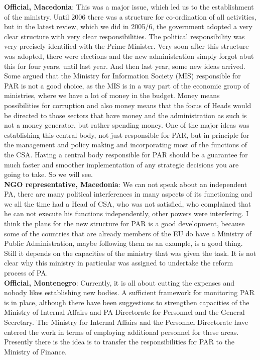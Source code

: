 \textbf{Official, Macedonia}: This was a major issue, which led us to the establishment of the ministry. Until 2006 there was a structure for co-ordination of all activities, but in the latest review, which we did in 2005/6, the government adopted a very clear structure with very clear responsibilities. The political responsibility was very precisely identified with the Prime Minister. Very soon after this structure was adopted, there were elections and the new administration simply forgot abut this for four years, until last year. And then last year, some new ideas arrived. Some argued that the Ministry for Information Society (MIS) responsible for PAR is not a good choice, as the MIS is in a way part of the economic group of ministries, where we have a lot of money in the budget. Money means possibilities for corruption and also money means that the focus of Heads would be directed to those sectors that have money and the administration as such is not a money generator, but rather spending money. One of the major ideas was establishing this central body, not just responsible for PAR, but in principle for the management and policy making and incorporating most of the functions of the CSA. Having a central body responsible for PAR should be a guarantee for much faster and smoother implementation of any strategic decisions you are going to take. So we will see.\\
\textbf{NGO representative, Macedonia}: We can not speak about an independent PA, there are many political interferences in many aspects of its functioning and we all the time had a Head of CSA, who was not satisfied, who complained that he can not execute his functions independently, other powers were interfering. I think the plans for the new structure for PAR is a good development, because some of the countries that are already members of the EU do have a Ministry of Public Administration, maybe following them as an example, is a good thing. Still it depends on the capacities of the ministry that was given the task. It is not clear why this ministry in particular was assigned to undertake the reform process of PA. \\
\textbf{Official, Montenegro}: Currently, it is all about cutting the expenses and nobody likes establishing new bodies. A sufficient framework for monitoring PAR is in place, although there have been suggestions to strengthen capacities of the Ministry of Internal Affairs and PA Directorate for Personnel and the General Secretary. The Ministry for Internal Affairs and the Personnel Directorate have entered the work in terms of employing additional personnel for these areas. Presently there is the idea is to transfer the responsibilities for PAR to the Ministry of Finance.\\
